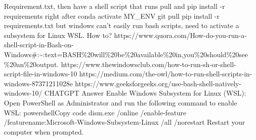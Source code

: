 \documentclass{article}%
\begin{document}
\newline%
%
Requirement.txt,  then have a shell script that runs pull and pip install {-}r requirements right after%
\newline%
\newline%
%
conda activate MY\_ENV%
\newline%
\newline%
%
git pull%
\newline%
\newline%
%
pip install {-}r requirements.txt%
\newline%
\newline%
%
but windows can’t easily run bash scripts, need to activate a subsystem for Linux WSL. How to?%
\newline%
\newline%
%
https://www.quora.com/How{-}do{-}you{-}run{-}a{-}shell{-}script{-}in{-}Bash{-}on{-}Windows\#:\textasciitilde{}:text=BASH\%20will\%20be\%20available\%20in,you\%20should\%20see\%20an\%20output. %
\newline%
\newline%
%
https://www.thewindowsclub.com/how{-}to{-}run{-}sh{-}or{-}shell{-}script{-}file{-}in{-}windows{-}10%
\newline%
\newline%
%
https://medium.com/the{-}owl/how{-}to{-}run{-}shell{-}scripts{-}in{-}windows{-}87371211028e %
\newline%
\newline%
%
https://www.geeksforgeeks.org/use{-}bash{-}shell{-}natively{-}windows{-}10/%
\newline%
\newline%
%
%
\newline%
\newline%
%
CHATGPT Answer %
\newline%
\newline%
%
Enable Windows Subsystem for Linux (WSL):%
\newline%
\newline%
%
Open PowerShell as Administrator and run the following command to enable WSL:%
\newline%
\newline%
%
powershellCopy code%
\newline%
\newline%
%
dism.exe /online /enable{-}feature /featurename:Microsoft{-}Windows{-}Subsystem{-}Linux /all /norestart %
\newline%
\newline%
%
Restart your computer when prompted.%
\end{document}
